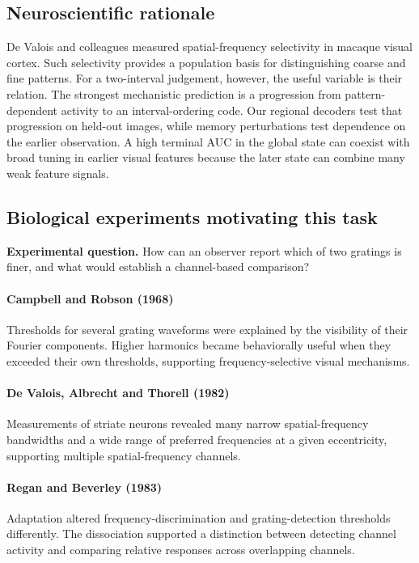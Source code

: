\documentclass[11pt]{article}
\begin{document}
\subsection{Neuroscientific rationale}
De Valois and colleagues measured spatial-frequency selectivity in macaque visual cortex. Such selectivity provides a population basis for distinguishing coarse and fine patterns. For a two-interval judgement, however, the useful variable is their relation. The strongest mechanistic prediction is a progression from pattern-dependent activity to an interval-ordering code. Our regional decoders test that progression on held-out images, while memory perturbations test dependence on the earlier observation. A high terminal AUC in the global state can coexist with broad tuning in earlier visual features because the later state can combine many weak feature signals.

\subsection{Biological experiments motivating this task}
\textbf{Experimental question.} How can an observer report which of two gratings is finer, and what would establish a channel-based comparison?

\paragraph{Campbell and Robson (1968)} Thresholds for several grating waveforms were explained by the visibility of their Fourier components. Higher harmonics became behaviorally useful when they exceeded their own thresholds, supporting frequency-selective visual mechanisms. \cite{bio_campbell}

\paragraph{De Valois, Albrecht and Thorell (1982)} Measurements of striate neurons revealed many narrow spatial-frequency bandwidths and a wide range of preferred frequencies at a given eccentricity, supporting multiple spatial-frequency channels. \cite{bio_devalois_f}

\paragraph{Regan and Beverley (1983)} Adaptation altered frequency-discrimination and grating-detection thresholds differently. The dissociation supported a distinction between detecting channel activity and comparing relative responses across overlapping channels. \cite{bio_regan}
\end{document}
